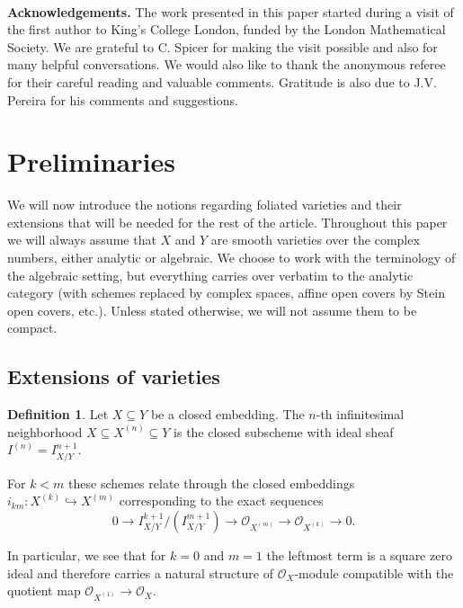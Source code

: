 \documentclass[reqno]{amsart}
\theoremstyle{plain}
\newcommand{\OO}{\mathcal{O}}
\theoremstyle{definition}
\newtheorem{definition}[theorem]{Definition}
\theoremstyle{named}
\begin{document}
\,
\,

\textbf{Acknowledgements.} The work presented in this paper started during a visit of the first author to King's College London, funded by the London Mathematical Society. We are grateful to C. Spicer for making the visit possible and also for many helpful conversations. We would also like to thank the anonymous referee for their careful reading and valuable comments. Gratitude is also due to J.V. Pereira for his comments and suggestions. 



\section{Preliminaries}\label{section2}
We will now introduce the notions regarding foliated varieties and their extensions that will be needed for the rest of the article. Throughout this paper we will always assume that $X$ and $Y$ are smooth varieties over the complex numbers, either analytic or algebraic. We choose to work with the terminology of the algebraic setting, but everything carries over verbatim to the analytic category (with schemes replaced by complex spaces, affine open covers by Stein open covers, etc.). Unless stated otherwise, we will not assume them to be compact.

\subsection{Extensions of varieties}

\begin{definition}
 Let $X\subseteq Y$ be a closed embedding. The $n$-th infinitesimal neighborhood $X\subseteq X^{(n)}\subseteq Y$ is the closed subscheme with ideal sheaf $I^{(n)}=I_{X/Y}^{n+1}$.
\end{definition}

For $k<m$ these schemes relate through the closed embeddings $i_{km}:X^{(k)}\hookrightarrow X^{(m)}$ corresponding to the exact sequences
\begin{equation}\label{eq:infneighb}
    0 \rightarrow I_{X/Y}^{k+1}/(I_{X/Y}^{m+1}) \rightarrow \OO_{X^{(m)}}\rightarrow \OO_{X^{(k)}} \rightarrow 0.
\end{equation} 

In particular, we see that for $k=0$ and $m=1$ the leftmost term is a square zero ideal and therefore carries a natural structure of $\OO_X$-module compatible with the quotient map $\OO_{X^{(1)}}\to \OO_X$.
\end{document}

